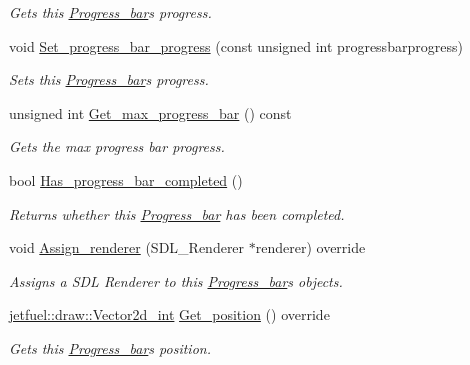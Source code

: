 \begin{DoxyCompactItemize}
\begin{DoxyCompactList}\small\item\em Gets this \hyperlink{classjetfuel_1_1gui_1_1Progress__bar}{Progress\+\_\+bar}\textquotesingle{}s progress. \end{DoxyCompactList}\item 
void \hyperlink{classjetfuel_1_1gui_1_1Progress__bar_a53343a5c7313be548245b9bac150b223}{Set\+\_\+progress\+\_\+bar\+\_\+progress} (const unsigned int progressbarprogress)
\begin{DoxyCompactList}\small\item\em Sets this \hyperlink{classjetfuel_1_1gui_1_1Progress__bar}{Progress\+\_\+bar}\textquotesingle{}s progress. \end{DoxyCompactList}\item 
unsigned int \hyperlink{classjetfuel_1_1gui_1_1Progress__bar_a6c9fdfbed3600490da1a9f1fb4a76003}{Get\+\_\+max\+\_\+progress\+\_\+bar} () const
\begin{DoxyCompactList}\small\item\em Gets the max progress bar progress. \end{DoxyCompactList}\item 
bool \hyperlink{classjetfuel_1_1gui_1_1Progress__bar_ab21545ddc2fbd947f1fbe9bdf11b959f}{Has\+\_\+progress\+\_\+bar\+\_\+completed} ()
\begin{DoxyCompactList}\small\item\em Returns whether this \hyperlink{classjetfuel_1_1gui_1_1Progress__bar}{Progress\+\_\+bar} has been completed. \end{DoxyCompactList}\item 
void \hyperlink{classjetfuel_1_1gui_1_1Progress__bar_a34797d42cedf5ff096eafb58c2e76128}{Assign\+\_\+renderer} (S\+D\+L\+\_\+\+Renderer $\ast$renderer) override
\begin{DoxyCompactList}\small\item\em Assigns a S\+DL Renderer to this \hyperlink{classjetfuel_1_1gui_1_1Progress__bar}{Progress\+\_\+bar}\textquotesingle{}s objects. \end{DoxyCompactList}\item 
\hyperlink{classjetfuel_1_1draw_1_1Vector2d}{jetfuel\+::draw\+::\+Vector2d\+\_\+int} \hyperlink{classjetfuel_1_1gui_1_1Progress__bar_a5771ea71b321c173383e89537cea0ae1}{Get\+\_\+position} () override
\begin{DoxyCompactList}\small\item\em Gets this \hyperlink{classjetfuel_1_1gui_1_1Progress__bar}{Progress\+\_\+bar}\textquotesingle{}s position. \end{DoxyCompactList}\item 

\end{DoxyCompactItemize}
